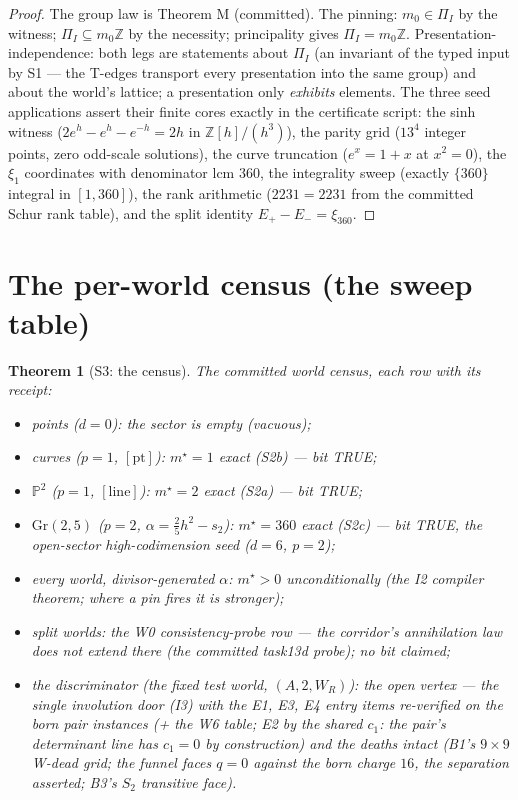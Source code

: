 \documentclass[11pt]{article}
\newtheorem{theorem}{Theorem}
\begin{document}
\begin{proof}
The group law is Theorem M (committed). The pinning: $m_0\in\Pi_I$ by the
witness; $\Pi_I\subseteq m_0\mathbb Z$ by the necessity; principality gives
$\Pi_I=m_0\mathbb Z$. Presentation-independence: both legs are statements
about $\Pi_I$ (an invariant of the typed input by S1 --- the T-edges transport
every presentation into the same group) and about the world's lattice; a
presentation only \emph{exhibits} elements. The three seed applications assert
their finite cores exactly in the certificate script: the sinh witness
($2e^h-e^h-e^{-h}=2h$ in $\mathbb Z[h]/(h^3)$), the parity grid
($13^4$ integer points, zero odd-scale solutions), the curve truncation
($e^x=1+x$ at $x^2=0$), the $\xi_1$ coordinates with denominator lcm $360$,
the integrality sweep (exactly $\{360\}$ integral in $[1,360]$), the rank
arithmetic ($2231=2231$ from the committed Schur rank table), and the split
identity $E_+-E_-=\xi_{360}$.
\end{proof}

\section{The per-world census (the sweep table)}

\begin{theorem}[S3: the census]
\label{thm:s3}
The committed world census, each row with its receipt:
\begin{itemize}
\item \emph{points} ($d=0$): the sector is empty (vacuous);
\item \emph{curves} ($p=1$, $[\mathrm{pt}]$): $m^\star=1$ exact (S2b) --- bit TRUE;
\item \emph{$\mathbb P^2$} ($p=1$, $[\mathrm{line}]$): $m^\star=2$ exact (S2a) --- bit TRUE;
\item \emph{$\mathrm{Gr}(2,5)$} ($p=2$, $\alpha=\tfrac25h^2-s_2$): $m^\star=360$
exact (S2c) --- bit TRUE, the open-sector high-codimension seed ($d=6$, $p=2$);
\item \emph{every world, divisor-generated $\alpha$}: $m^\star>0$
\emph{unconditionally} (the I2 compiler theorem; where a pin fires it is stronger);
\item \emph{split worlds}: the W0 consistency-probe row --- the corridor's
annihilation law does not extend there (the committed task13d probe); no bit claimed;
\item \emph{the discriminator} (the fixed test world, $(A,2,W_R)$): the
\emph{open vertex} --- the single involution door (I3) with the E1, E3, E4 entry items re-verified on the born pair instances (+ the W6 table; E2 by the shared $c_1$: the pair's determinant line has $c_1=0$ by construction) and the deaths intact (B1's
$9\times9$ W-dead grid; the funnel faces $q=0$ against the born charge $16$,
the separation asserted; B3's $S_2$ transitive face).
\end{itemize}
\end{theorem}
\end{document}
